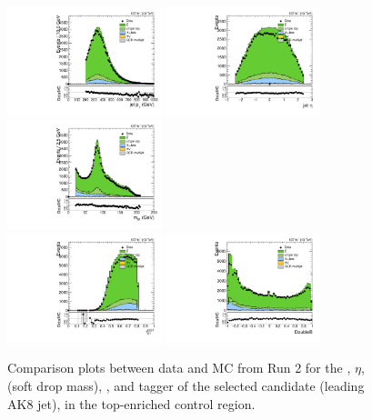 \begin{figure}[htbp]
  \centering
  \includegraphics[width=0.4\textwidth]{fig/controlPlots/CR_b1_allL_allP_allC_allD_Run2_lnujj_l2_pt.pdf}
  \includegraphics[width=0.4\textwidth]{fig/controlPlots/CR_b1_allL_allP_allC_allD_Run2_lnujj_l2_eta.pdf}\\
  \includegraphics[width=0.4\textwidth]{fig/controlPlots/CR_b1_allL_allP_allC_allD_Run2_mjet.pdf}\\
  \includegraphics[width=0.4\textwidth]{fig/controlPlots/CR_b1_allL_allP_allC_allD_Run2_tau21DDT.pdf}
  \includegraphics[width=0.4\textwidth]{fig/controlPlots/CR_b1_allL_allP_allC_allD_Run2_DoubleB.pdf}\\
  \caption{
    Comparison plots between data and MC from Run 2 for the \pt, $\eta$, \MJ (soft drop mass), \nsubjDDT, and \DoubleB tagger of the selected \Vhad candidate (leading AK8 jet), in the top-enriched control region.
  }
  \label{fig:CR_controlPlotsRun2_3}
\end{figure}

